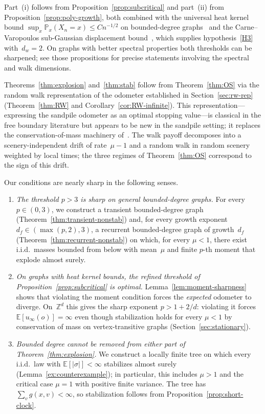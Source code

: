 \documentclass[11pt]{amsart}
\theoremstyle{plain}
\theoremstyle{definition}
\newcommand{\Z}{\mathbb{Z}}
\newcommand{\E}{\mathbb{E}}
\renewcommand{\P}{\mathbb{P}}
\begin{document}
	
	Part~(i) follows from Proposition~\ref{prop:subcritical} and part~(ii) from Proposition~\ref{prop:poly-growth}, both combined with the universal heat kernel bound $\sup_x\P_x(X_n=x)\leq C n^{-1/2}$ on bounded-degree graphs~\citep[Example~5.14]{Grigoryan} and the Carne--Varopoulos sub-Gaussian displacement bound~\citep[Section~13.2]{LP16}, which supplies hypothesis~\ref{H3} with~$d_w=2$. On graphs with better spectral properties both thresholds can be sharpened; see those propositions for precise statements involving the spectral and walk dimensions.
	
	Theorems~\ref{thm:explosion} and~\ref{thm:stab} follow from Theorem~\ref{thm:OS} via the random walk representation of the odometer established in Section~\ref{sec:rw-rep} (Theorem~\ref{thm:RW} and Corollary~\ref{cor:RW-infinite}). This representation---expressing the sandpile odometer as an optimal stopping value---is classical in the free boundary literature \citep{PS06} but appears to be new in the sandpile setting; it replaces the conservation-of-mass machinery of~\citet{div-sand-crit}. The walk payoff decomposes into a scenery-independent drift of rate~$\mu-1$ and a random walk in random scenery weighted by local times; the three regimes of Theorem~\ref{thm:OS} correspond to the sign of this drift.
	
	
	
	Our conditions are nearly sharp in the following senses.
	\begin{enumerate}[label=(\alph*)]
		\item \textit{The threshold $p > 3$ is sharp on general bounded-degree graphs.} For every $p \in (0,3)$, we construct a transient bounded-degree graph (Theorem~\ref{thm:transient-nonstab}) and, for every growth exponent $d_f \in (\max(p,2),3)$, a recurrent bounded-degree graph of growth~$d_f$ (Theorem~\ref{thm:recurrent-nonstab}) on which, for every $\mu < 1$, there exist i.i.d.\ masses bounded from below with mean~$\mu$ and finite $p$-th moment that explode almost surely.
		\item \textit{On graphs with heat kernel bounds, the refined threshold of Proposition~\ref{prop:subcritical} is optimal.} Lemma~\ref{lem:moment-sharpness} shows that violating the moment condition forces the \emph{expected} odometer to diverge. On~$\Z^d$ this gives the sharp exponent $p > 1+2/d$: violating it forces $\E[u_\infty(o)]=\infty$ even though stabilization holds for every $\mu<1$ by conservation of mass on vertex-transitive graphs (Section~\ref{sec:stationary}).
		\item \textit{Bounded degree cannot be removed from either part of Theorem~\ref{thm:explosion}.} We construct a locally finite tree on which every i.i.d.\ law with $\E[|\sigma|]<\infty$ stabilizes almost surely (Lemma~\ref{ex:counterexample}); in particular, this includes $\mu>1$ and the critical case $\mu=1$ with positive finite variance. The tree has $\sum_v g(x,v)<\infty$, so stabilization follows from Proposition~\ref{prop:short-clock}.
	\end{enumerate}
	
\end{document}
